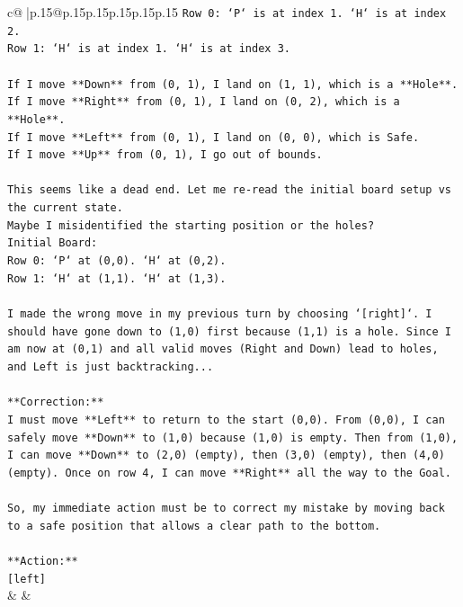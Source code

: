 \documentclass{article}
\begin{document}
{\begin{supertabular}{c@{$\;$}|p{.15\linewidth}@{}p{.15\linewidth}p{.15\linewidth}p{.15\linewidth}p{.15\linewidth}p{.15\linewidth}}
{{{\texttt{Row 0: `P` is at index 1. `H` is at index 2.} \\
\texttt{Row 1: `H` is at index 1. `H` is at index 3.} \\
\\ 
\texttt{If I move **Down** from (0, 1), I land on (1, 1), which is a **Hole**.} \\
\texttt{If I move **Right** from (0, 1), I land on (0, 2), which is a **Hole**.} \\
\texttt{If I move **Left** from (0, 1), I land on (0, 0), which is Safe.} \\
\texttt{If I move **Up** from (0, 1), I go out of bounds.} \\
\\ 
\texttt{This seems like a dead end. Let me re{-}read the initial board setup vs the current state.} \\
\texttt{Maybe I misidentified the starting position or the holes?} \\
\texttt{Initial Board:} \\
\texttt{Row 0: `P` at (0,0). `H` at (0,2).} \\
\texttt{Row 1: `H` at (1,1). `H` at (1,3).} \\
\\ 
\texttt{I made the wrong move in my previous turn by choosing `{[}right{]}`. I should have gone down to (1,0) first because (1,1) is a hole. Since I am now at (0,1) and all valid moves (Right and Down) lead to holes, and Left is just backtracking...} \\
\\ 
\texttt{**Correction:**} \\
\texttt{I must move **Left** to return to the start (0,0). From (0,0), I can safely move **Down** to (1,0) because (1,0) is empty. Then from (1,0), I can move **Down** to (2,0) (empty), then (3,0) (empty), then (4,0) (empty). Once on row 4, I can move **Right** all the way to the Goal.} \\
\\ 
\texttt{So, my immediate action must be to correct my mistake by moving back to a safe position that allows a clear path to the bottom.} \\
\\ 
\texttt{**Action:**} \\
\texttt{{[}left{]}} \\
            }
        }
    }
    & & \\ \\


\end{supertabular}}
\end{document}
